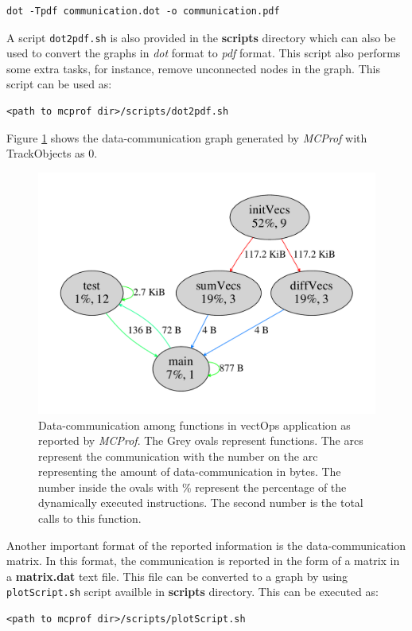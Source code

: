 \documentclass[10pt]{article}
\newcommand{\MCPROF}{\emph{MCProf}}
\begin{document}
{
\small
\begin{Verbatim}[frame=single]
dot -Tpdf communication.dot -o communication.pdf
\end{Verbatim}
}

A script \verb|dot2pdf.sh| is also provided in the \textbf{scripts} directory which can
also be used to convert the graphs in \emph{dot} format to \emph{pdf} format. This script
also performs some extra tasks, for instance, remove unconnected nodes in the
graph. This script can be used as:

{
\small
\begin{Verbatim}[frame=single]
<path to mcprof dir>/scripts/dot2pdf.sh
\end{Verbatim}
}

Figure \ref{fig:comm} shows the data-communication graph generated by \MCPROF{}
with TrackObjects as 0.

\begin{figure}[!h]
\centering
\includegraphics[width=0.55\linewidth]{figures/comm.pdf}
\caption{Data-communication among functions in vectOps application as reported
    by \MCPROF{}. The Grey ovals represent functions. The arcs represent the
    communication with the number on the arc representing the amount of
    data-communication in bytes. The number inside the ovals with \% represent
    the percentage of the dynamically executed instructions. The second number
    is the total calls to this function.}
\label{fig:comm}
\end{figure}

Another important format of the reported information is the data-communication 
matrix. In this format, the communication is reported in the form of a matrix in 
a \textbf{matrix.dat} text file. This file can be converted to a graph by using 
\verb|plotScript.sh| script availble in \textbf{scripts} directory. This can be 
executed as:

{
\small
\begin{Verbatim}[frame=single]
<path to mcprof dir>/scripts/plotScript.sh
\end{Verbatim}
}
\end{document}
